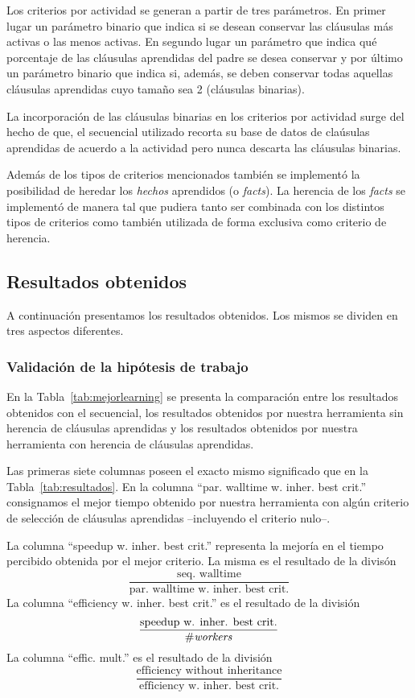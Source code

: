 Los criterios por actividad se generan a partir de tres parámetros. En primer
lugar un parámetro binario que indica si se desean conservar las cláusulas más
activas o las menos activas. En segundo lugar un parámetro que indica qué
porcentaje de las cláusulas aprendidas del padre se desea conservar y por
último un parámetro binario que indica si, además, se deben conservar todas
aquellas cláusulas aprendidas cuyo tamaño sea 2 (cláusulas binarias).

La incorporación de las cláusulas binarias en los criterios por actividad
surge del hecho de que, el \ssolver secuencial utilizado recorta su base de
datos de claúsulas aprendidas de acuerdo a la actividad pero nunca descarta
las cláusulas binarias.

Además de los tipos de criterios mencionados también se implementó la
posibilidad de heredar los \emph{hechos} aprendidos (o \emph{facts}). La
herencia de los \emph{facts} se implementó de manera tal que pudiera tanto ser
combinada con los distintos tipos de criterios como también utilizada de forma
exclusiva como criterio de herencia.




\subsection{Resultados obtenidos}

A continuación presentamos los resultados obtenidos. Los mismos se dividen en
tres aspectos diferentes. 

\subsubsection{Validación de la hipótesis de trabajo}

En la Tabla~\ref{tab:mejorlearning} se presenta la comparación entre los
resultados obtenidos con el \ssolver secuencial, los resultados obtenidos por
nuestra herramienta sin herencia de cláusulas aprendidas y los resultados
obtenidos por nuestra herramienta con herencia de cláusulas aprendidas.

Las primeras siete columnas poseen el exacto mismo significado que en la
Tabla~\ref{tab:resultados}. En la columna ``par. walltime w. inher. best crit.'' consignamos
el mejor tiempo obtenido por nuestra herramienta con algún criterio de
selección de cláusulas aprendidas --incluyendo el criterio nulo--.

La columna ``speedup w. inher. best crit.'' representa la mejoría en el tiempo
percibido obtenida por el mejor criterio. La misma es el resultado de la
divisón $$\frac{\text{seq. walltime}}{\text{par. walltime w. inher. best
crit.}}$$ La columna ``efficiency w. inher. best crit.'' es el resultado de la
división $$\frac{\text{speedup w. inher. best crit.}}{\text{\#\emph{workers}}}$$ La
columna ``effic. mult.'' es el resultado de la división
$$\frac{\text{efficiency without inheritance}}{\text{efficiency w. inher. best
crit.}}$$

